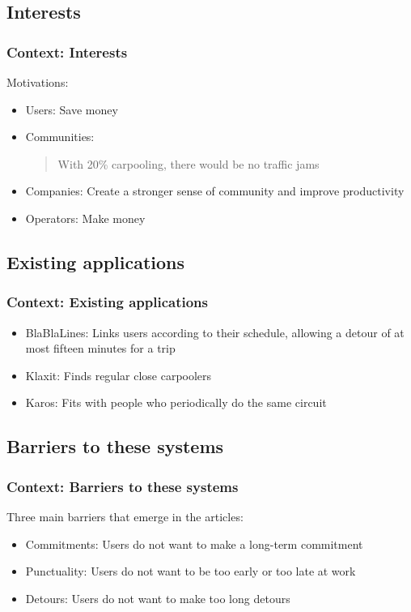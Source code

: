 \documentclass{beamer}
\begin{document}
	\subsection{Interests}
	\begin{frame}[label=]
		\frametitle{Context: Interests}
		Motivations:
		\begin{itemize}
			\item Users: Save money
			\item Communities: \begin{quote}With 20\% carpooling, there would be no traffic jams\end{quote} 
			\item Companies: Create a stronger sense of community and improve productivity
			\item Operators: Make money
		\end{itemize}
	\end{frame}
	\subsection{Existing applications}
	\begin{frame}[label=]
		\frametitle{Context: Existing applications}
		\begin{itemize}
			\item BlaBlaLines: Links users according to their schedule, allowing a detour of at most fifteen minutes for a trip
			\item Klaxit: Finds regular close carpoolers
			\item Karos: Fits with people who periodically do the same circuit
		\end{itemize}
	\end{frame}
	\subsection{Barriers to these systems}
	\begin{frame}[label=]
		\frametitle{Context: Barriers to these systems}
		Three main barriers that emerge in the articles:
		\begin{itemize}
			\item Commitments: Users do not want to make a long-term commitment
			\item Punctuality: Users do not want to be too early or too late at work
			\item Detours: Users do not want to make too long detours
		\end{itemize}
	\end{frame}
	
\end{document}
